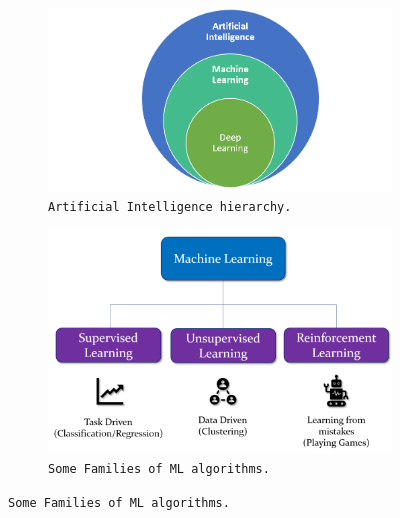 \begin{figure}[ht]
    \begin{subfigure}[b]{0.45\textwidth}
        \includegraphics[width=\textwidth]{images/background/ai_ml_dl}
        \caption{\texttt{Artificial Intelligence hierarchy.}}
        \label{fig:ml_hierarchy}
    \end{subfigure}
    \hfill
    \begin{subfigure}[b]{0.45\textwidth}
        \includegraphics[width=\textwidth]{images/background/ML_Types}
        \caption{\texttt{Some Families of ML algorithms.}}
        \label{fig:ml_types}
    \end{subfigure}
    \hfill
    
\end{figure}






